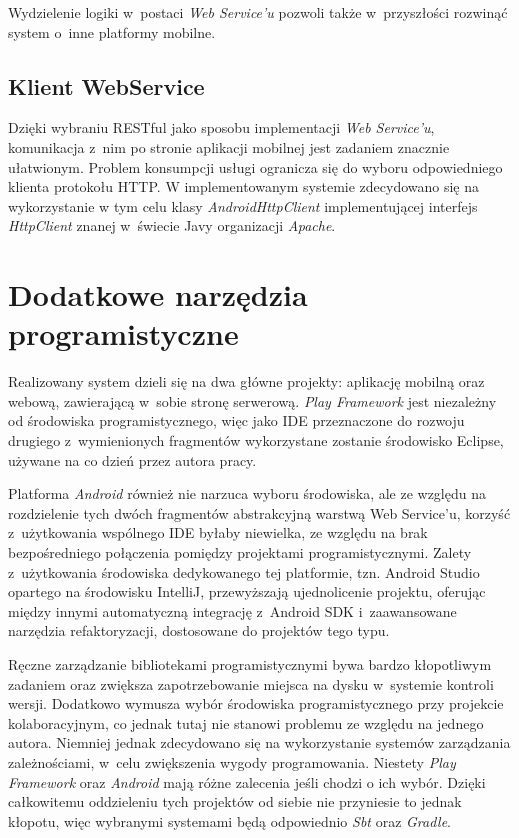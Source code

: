 \documentclass[11pt]{aghdpl}
\begin{document}
Wydzielenie logiki w~postaci \emph{Web Service'u} pozwoli także w~przyszłości rozwinąć system o~inne platformy mobilne.

\subsection{Klient WebService}

Dzięki wybraniu RESTful jako sposobu implementacji \emph{Web Service'u}, komunikacja z~nim po stronie aplikacji mobilnej jest zadaniem znacznie ułatwionym. Problem konsumpcji usługi ogranicza się do wyboru odpowiedniego klienta protokołu HTTP. W implementowanym systemie zdecydowano się na wykorzystanie w tym celu klasy \emph{AndroidHttpClient} implementującej interfejs \emph{HttpClient} znanej w~świecie Javy organizacji \emph{Apache}.

\section{Dodatkowe narzędzia programistyczne}

Realizowany system dzieli się na dwa główne projekty: aplikację mobilną oraz webową, zawierającą w~sobie stronę serwerową. \emph{Play Framework} jest niezależny od środowiska programistycznego, więc jako IDE przeznaczone do rozwoju drugiego z~wymienionych fragmentów wykorzystane zostanie środowisko Eclipse, używane na co dzień przez autora pracy.

Platforma \emph{Android} również nie narzuca wyboru środowiska, ale ze względu na rozdzielenie tych dwóch fragmentów abstrakcyjną warstwą Web Service'u, korzyść z~użytkowania wspólnego IDE byłaby niewielka, ze względu na brak bezpośredniego połączenia pomiędzy projektami programistycznymi. Zalety z~użytkowania środowiska dedykowanego tej platformie, tzn. Android Studio opartego na środowisku IntelliJ, przewyższają ujednolicenie projektu, oferując między innymi automatyczną integrację z~Android SDK i~zaawansowane narzędzia refaktoryzacji, dostosowane do projektów tego typu.

Ręczne zarządzanie bibliotekami programistycznymi bywa bardzo kłopotliwym zadaniem oraz zwiększa zapotrzebowanie miejsca na dysku w~systemie kontroli wersji. Dodatkowo wymusza wybór środowiska programistycznego przy projekcie kolaboracyjnym, co jednak tutaj nie stanowi problemu ze względu na jednego autora. Niemniej jednak zdecydowano się na wykorzystanie systemów zarządzania zależnościami, w~celu zwiększenia wygody programowania. Niestety \emph{Play Framework} oraz \emph{Android} mają różne zalecenia jeśli chodzi o ich wybór. Dzięki całkowitemu oddzieleniu tych projektów od siebie nie przyniesie to jednak kłopotu, więc wybranymi systemami będą odpowiednio \emph{Sbt} oraz \emph{Gradle}.
\end{document}
